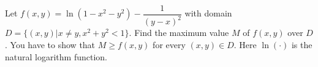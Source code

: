 Let $f(x, y) = \ln(1 - x^2 - y^2) - \dfrac{1}{(y - x)^2}$ with domain $D =
\lbrace (x, y) | x \ne y, x^2 + y^2 < 1 \rbrace$. Find the maximum value $M$ of
$f(x, y)$ over $D$. You have to show that $M \ge f(x, y)$ for every $(x, y) \in
D$. Here $\ln(\cdot)$ is the natural logarithm function.
